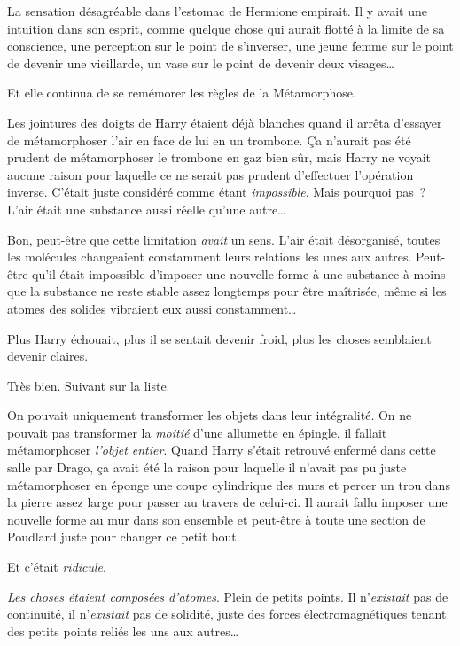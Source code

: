 La sensation désagréable dans l'estomac de Hermione empirait.
Il y avait une intuition dans son esprit, comme quelque chose qui aurait flotté à la limite de sa conscience, une perception sur le point de s'inverser, une jeune femme sur le point de devenir une vieillarde, un vase sur le point de devenir deux visages…

Et elle continua de se remémorer les règles de la Métamorphose.

\later

Les jointures des doigts de Harry étaient déjà blanches quand il arrêta d'essayer de métamorphoser l'air en face de lui en un trombone.
Ça n'aurait pas été prudent de métamorphoser le trombone en gaz bien sûr, mais Harry ne voyait aucune raison pour laquelle ce ne serait pas prudent d'effectuer l'opération inverse.
C'était juste considéré comme étant \emph{impossible}.
Mais pourquoi pas~?
L'air était une substance aussi réelle qu'une autre…

Bon, peut-être que cette limitation \emph{avait} un sens.
L'air était désorganisé, toutes les molécules changeaient constamment leurs relations les unes aux autres.
Peut-être qu'il était impossible d'imposer une nouvelle forme à une substance à moins que la substance ne reste stable assez longtemps pour être maîtrisée, même si les atomes des solides vibraient eux aussi constamment…

Plus Harry échouait, plus il se sentait devenir froid, plus les choses semblaient devenir claires.

Très bien.
Suivant sur la liste.

On pouvait uniquement transformer les objets dans leur intégralité.
On ne pouvait pas transformer la \emph{moitié} d'une allumette en épingle, il fallait métamorphoser \emph{l'objet entier}.
Quand Harry s'était retrouvé enfermé dans cette salle par Drago, ça avait été la raison pour laquelle il n'avait pas pu juste métamorphoser en éponge une coupe cylindrique des murs et percer un trou dans la pierre assez large pour passer au travers de celui-ci.
Il aurait fallu imposer une nouvelle forme au mur dans son ensemble et peut-être à toute une section de Poudlard juste pour changer ce petit bout.

Et c'était \emph{ridicule}.

\emph{Les choses étaient composées d'atomes}.
Plein de petits points.
Il n'\emph{existait} pas de continuité, il n'\emph{existait} pas de solidité, juste des forces électromagnétiques tenant des petits points reliés les uns aux autres…

